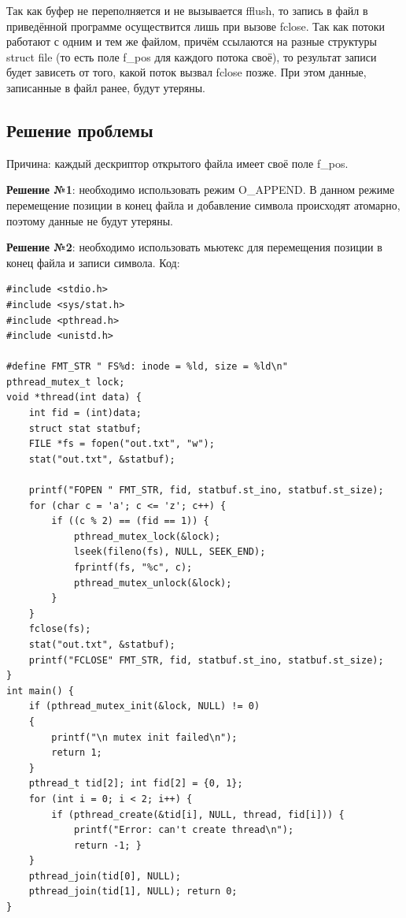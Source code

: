 \documentclass[12pt]{report}
\begin{document}
Так как буфер не переполняется и не вызывается fflush, то запись в файл в приведённой программе осуществится лишь при вызове fclose. Так как потоки работают с одним и тем же файлом, причём ссылаются на разные структуры struct file (то есть поле f\_pos для каждого потока своё), то результат записи будет зависеть от того, какой поток вызвал fclose позже. При этом данные, записанные в файл ранее, будут утеряны.

\subsection*{Решение проблемы}
Причина: каждый дескриптор открытого файла имеет своё поле f\_pos. 

\textbf{Решение №1}: необходимо использовать режим O\_APPEND. В данном режиме перемещение позиции в конец файла и добавление символа происходят атомарно, поэтому данные не будут утеряны. 

\textbf{Решение №2}: необходимо использовать мьютекс для перемещения позиции в конец файла и записи символа. Код:
\begin{lstlisting}
#include <stdio.h>
#include <sys/stat.h>
#include <pthread.h>
#include <unistd.h>

#define FMT_STR " FS%d: inode = %ld, size = %ld\n"
pthread_mutex_t lock;
void *thread(int data) {
    int fid = (int)data;
    struct stat statbuf;
    FILE *fs = fopen("out.txt", "w");
    stat("out.txt", &statbuf);

    printf("FOPEN " FMT_STR, fid, statbuf.st_ino, statbuf.st_size);
    for (char c = 'a'; c <= 'z'; c++) {
        if ((c % 2) == (fid == 1)) {
            pthread_mutex_lock(&lock);
            lseek(fileno(fs), NULL, SEEK_END);
            fprintf(fs, "%c", c);
            pthread_mutex_unlock(&lock);
        }
    }
    fclose(fs);
    stat("out.txt", &statbuf);
    printf("FCLOSE" FMT_STR, fid, statbuf.st_ino, statbuf.st_size);
}
int main() {
    if (pthread_mutex_init(&lock, NULL) != 0)
    {
        printf("\n mutex init failed\n");
        return 1;
    }
    pthread_t tid[2]; int fid[2] = {0, 1};
    for (int i = 0; i < 2; i++) {
        if (pthread_create(&tid[i], NULL, thread, fid[i])) {
            printf("Error: can't create thread\n");
            return -1; }
    }
    pthread_join(tid[0], NULL);
    pthread_join(tid[1], NULL); return 0;
}
\end{lstlisting}
\newpage
\end{document}
